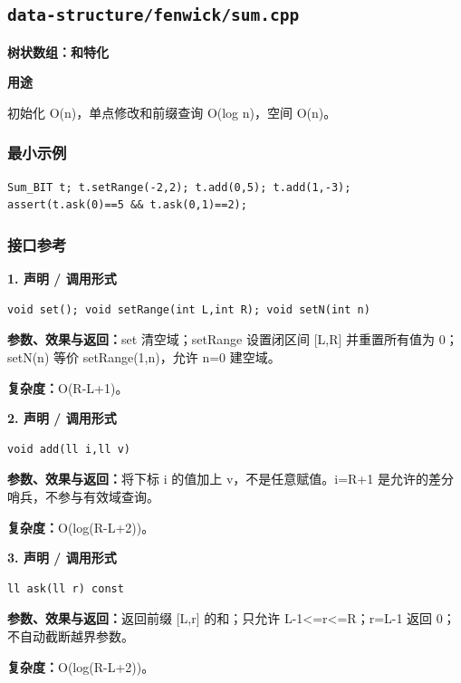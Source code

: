 \documentclass[UTF8,a4paper,10pt]{ctexart}
\newcommand{\TemplUsage}[1]{\textbf{用途}\par #1\par}
\begin{document}
\subsection{\texttt{data-structure/fenwick/sum.cpp}}
\textbf{树状数组：和特化}\par
\TemplUsage{初始化 O(n)，单点修改和前缀查询 O(log n)，空间 O(n)。}
\subsubsection*{最小示例}
\begin{lstlisting}
Sum_BIT t; t.setRange(-2,2); t.add(0,5); t.add(1,-3);
assert(t.ask(0)==5 && t.ask(0,1)==2);
\end{lstlisting}
\subsubsection*{接口参考}
\noindent\begin{minipage}{\textwidth}
\textbf{1. 声明 / 调用形式}
\begin{lstlisting}
void set(); void setRange(int L,int R); void setN(int n)
\end{lstlisting}
\textbf{参数、效果与返回：}set 清空域；setRange 设置闭区间 [L,R] 并重置所有值为 0；setN(n) 等价 setRange(1,n)，允许 n=0 建空域。

\textbf{复杂度：}O(R-L+1)。

\end{minipage}\par\vspace{0.4em}
\noindent\begin{minipage}{\textwidth}
\textbf{2. 声明 / 调用形式}
\begin{lstlisting}
void add(ll i,ll v)
\end{lstlisting}
\textbf{参数、效果与返回：}将下标 i 的值加上 v，不是任意赋值。i=R+1 是允许的差分哨兵，不参与有效域查询。

\textbf{复杂度：}O(log(R-L+2))。

\end{minipage}\par\vspace{0.4em}
\noindent\begin{minipage}{\textwidth}
\textbf{3. 声明 / 调用形式}
\begin{lstlisting}
ll ask(ll r) const
\end{lstlisting}
\textbf{参数、效果与返回：}返回前缀 [L,r] 的和；只允许 L-1<=r<=R；r=L-1 返回 0；不自动截断越界参数。

\textbf{复杂度：}O(log(R-L+2))。

\end{minipage}\par\vspace{0.4em}
\end{document}

